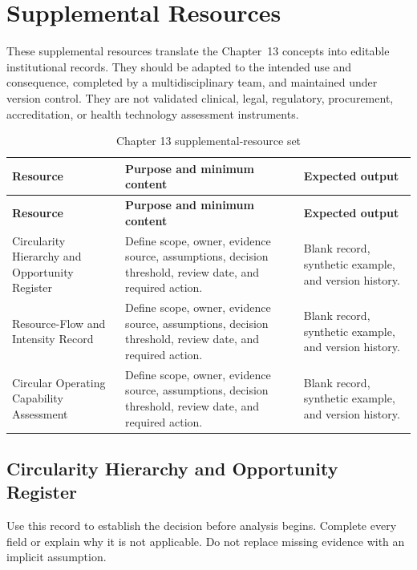 \section{Supplemental Resources}
\label{sec:comp-ch13-supplemental}

These supplemental resources translate the Chapter~13 concepts into editable
institutional records. They should be adapted to the intended use and consequence,
completed by a multidisciplinary team, and maintained under version control. They
are not validated clinical, legal, regulatory, procurement, accreditation, or health
technology assessment instruments.

\begin{longtable}{@{}p{}p{}p{}@{}}
\caption{Chapter 13 supplemental-resource set}
\label{tab:comp-ch13-supplemental-set}\\
\toprule
\textbf{Resource} & \textbf{Purpose and minimum content} & \textbf{Expected output} \\
\midrule
\endfirsthead
\toprule
\textbf{Resource} & \textbf{Purpose and minimum content} & \textbf{Expected output} \\
\midrule
\endhead
\bottomrule
\endlastfoot
Circularity Hierarchy and Opportunity Register & Define scope, owner, evidence source, assumptions, decision threshold, review date, and required action. & Blank record, synthetic example, and version history. \\
Resource-Flow and Intensity Record & Define scope, owner, evidence source, assumptions, decision threshold, review date, and required action. & Blank record, synthetic example, and version history. \\
Circular Operating Capability Assessment & Define scope, owner, evidence source, assumptions, decision threshold, review date, and required action. & Blank record, synthetic example, and version history. \\
\end{longtable}

\subsection{Circularity Hierarchy and Opportunity Register}
\label{sec:comp-ch13-supp-1}
Use this record to establish the decision before analysis begins. Complete every
field or explain why it is not applicable. Do not replace missing evidence with an
implicit assumption.

